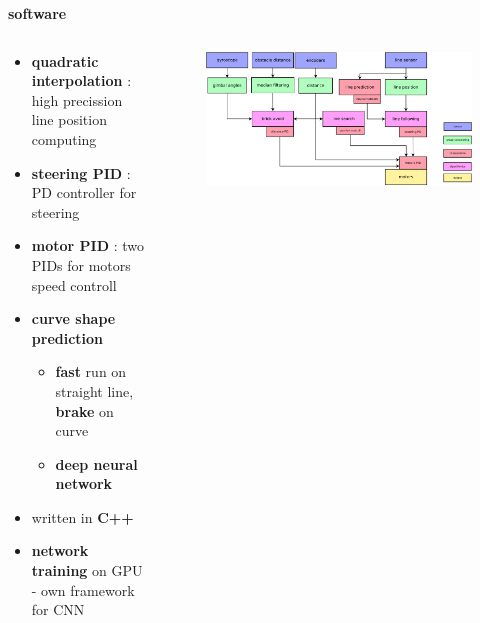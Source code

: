 \documentclass[xcolor=dvipsnames]{beamer}
\begin{document}
\begin{frame}{\bf software}



\begin{columns}

    \begin{column}{0.5\textwidth}  %
    {\small
        \begin{itemize}
            \item {\bf quadratic interpolation}  : high precission line position computing
            \item {\bf steering PID}  : PD controller for steering
            \item {\bf motor PID}  : two PIDs for motors speed controll
            \item {\bf curve shape prediction}
                \begin{itemize}
                    \item {\bf fast} run on straight line, {\bf brake} on curve
                    \item {\color{red} \bf deep neural network}
                \end{itemize}
            \item written in {\bf C++}
            \item {\bf network training} on GPU - own framework for CNN
        \end{itemize}
    }
    \end{column}

    \begin{column}{0.5\textwidth}

        \begin{figure}
            \includegraphics[scale=0.1]{../images/motoko_suftware_blocks.png}
        \end{figure}

    \end{column}

\end{columns}

\end{frame}
\end{document}
